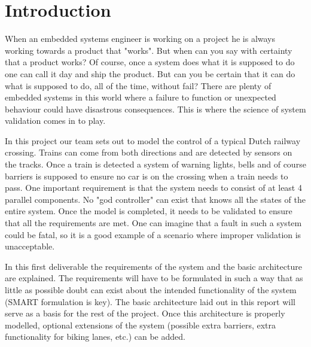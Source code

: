 \documentclass[final]{report}
\begin{document}
\chapter{Introduction}
When an embedded systems engineer is working on a project he is always working towards a product that "works". But when can you say with certainty that a product works? Of course, once a system does what it is supposed to do one can call it day and ship the product. But can you be certain that it can do what is supposed to do, all of the time, without fail? There are plenty of embedded systems in this world where a failure to function or unexpected behaviour could have disastrous consequences. This is where the science of system validation comes in to play.

In this project our team sets out to model the control of a typical Dutch railway crossing. Trains can come from both directions and are detected by sensors on the tracks. Once a train is detected a system of warning lights, bells and of course barriers is supposed to ensure no car is on the crossing when a train needs to pass. One important requirement is that the system needs to consist of at least 4 parallel components. No "god controller" can exist that knows all the states of the entire system. Once the model is completed, it needs to be validated to ensure that all the requirements are met. One can imagine that a fault in such a system could be fatal, so it is a good example of a scenario where improper validation is unacceptable.

In this first deliverable the requirements of the system and the basic architecture are explained. The requirements will have to be formulated in such a way that as little as possible doubt can exist about the intended functionality of the system (SMART formulation is key). The basic architecture laid out in this report will serve as a basis for the rest of the project. Once this architecture is properly modelled, optional extensions of the system (possible extra barriers, extra functionality for biking lanes, etc.) can be added.
\end{document}
